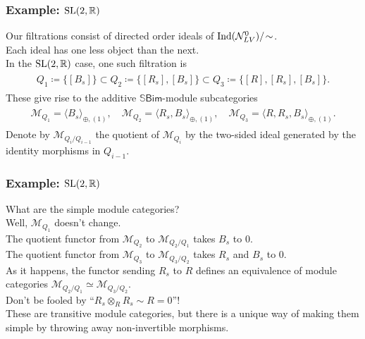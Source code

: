 \documentclass{beamer}
\newcommand{\textcat}[1]{\mathrm{\textsf{#1}}}
\begin{document}
\begin{frame}
\frametitle{Example: $\textup{SL}(2, \mathbb{R})$}
Our filtrations consist of directed order ideals of $\textup{Ind}(\mathcal{N}_{LV}^0)/\!\sim$.\\ Each ideal has one less object than the next.\\[2ex]

In the $\textup{SL}(2, \mathbb{R})$ case, one such filtration is
\begin{align*}
\begin{split}
Q_1 \coloneqq \{[B_{s}]\} \subset Q_2 \coloneqq \{[R_{s}], [B_{s}]\} \subset Q_3 \coloneqq \{[R], [R_{s}], [B_{s}]\}.
\end{split}
\end{align*}
These give rise to the additive $\mathbb{S}\textcat{Bim}$-module subcategories
\begin{align*}
\begin{split}
\mathcal{M}_{Q_1} = \langle B_{s} \rangle_{\oplus,(1)},\quad\mathcal{M}_{Q_2} = \langle R_{s}, B_{s}\rangle_{\oplus,(1)},\quad\mathcal{M}_{Q_3} = \langle R, R_{s}, B_{s}\rangle_{\oplus,(1)}.
\end{split}
\end{align*}
Denote by $\mathcal{M}_{Q_i/Q_{i-1}}$ the quotient of $\mathcal{M}_{Q_i}$ by the two-sided ideal generated by the identity morphisms in $Q_{i-1}$.
\end{frame}

\begin{frame}
\frametitle{Example: $\textup{SL}(2, \mathbb{R})$}
What are the simple module categories?\\[2ex]

Well, $\mathcal{M}_{Q_1}$ doesn't change.\\
The quotient functor from $\mathcal{M}_{Q_2}$ to $\mathcal{M}_{Q_2/Q_1}$ takes $B_s$ to $0$.\\
The quotient functor from $\mathcal{M}_{Q_3}$ to $\mathcal{M}_{Q_3/Q_2}$ takes $R_s$ and $B_s$ to $0$.\\[2ex]

As it happens, the functor sending $R_s$ to $R$ defines an equivalence of module categories $\mathcal{M}_{Q_2/Q_1} \simeq \mathcal{M}_{Q_3/Q_2}$.\\[2ex]

Don't be fooled by ``$R_s \otimes_R R_s \sim R = 0$''!\\[2ex]

These are transitive module categories, but there is a unique way of making them simple by throwing away non-invertible morphisms.
\end{frame}
\end{document}
